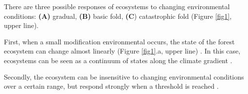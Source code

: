 


There are three possible responses of ecosystems to changing environmental
conditions: \textbf{(A)} gradual, \textbf{(B)} basic fold, \textbf{(C})
catastrophic fold  \cite{Scheffer2001} (Figure \ref{fig1}, upper line).


First, when a small modification environmental occurs, the state of the forest ecosystem can
change almost linearly (Figure \ref{fig1}.a, upper line)
\cite{Scheffer2001,Scheffer2009}. In this case, ecosystems can be seen
as a continuum of states along the climate gradient
\cite{Scheffer2001,Scheffer2009,scheffer2009critical}.


Secondly, the ecosystem can be insensitive to
changing environmental conditions over a certain range, but respond
strongly when a threshold is reached \cite{scheffer2009critical}. 


